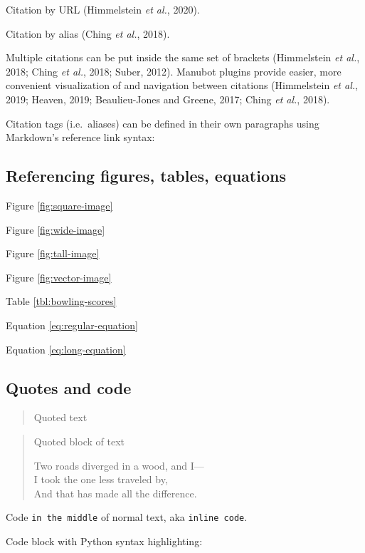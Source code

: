 Citation by URL (Himmelstein \emph{et al.}, 2020).

Citation by alias (Ching \emph{et al.}, 2018).

Multiple citations can be put inside the same set of brackets (Himmelstein \emph{et al.}, 2018; Ching \emph{et al.}, 2018; Suber, 2012).
Manubot plugins provide easier, more convenient visualization of and navigation between citations (Himmelstein \emph{et al.}, 2019; Heaven, 2019; Beaulieu-Jones and Greene, 2017; Ching \emph{et al.}, 2018).

Citation tags (i.e.~aliases) can be defined in their own paragraphs using Markdown's reference link syntax:

\hypertarget{referencing-figures-tables-equations}{%
\subsection{Referencing figures, tables, equations}\label{referencing-figures-tables-equations}}

Figure \ref{fig:square-image}

Figure \ref{fig:wide-image}

Figure \ref{fig:tall-image}

Figure \ref{fig:vector-image}

Table \ref{tbl:bowling-scores}

Equation \ref{eq:regular-equation}

Equation \ref{eq:long-equation}

\hypertarget{quotes-and-code}{%
\subsection{Quotes and code}\label{quotes-and-code}}

\begin{quote}
Quoted text
\end{quote}

\begin{quote}
Quoted block of text

Two roads diverged in a wood, and I---\\
I took the one less traveled by,\\
And that has made all the difference.
\end{quote}

Code \texttt{in\ the\ middle} of normal text, aka \texttt{inline\ code}.

Code block with Python syntax highlighting:

